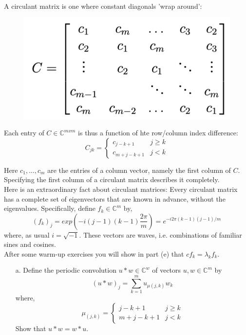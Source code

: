 \documentclass[12pt]{article}
\makeatletter
\theoremstyle{homework}
\newenvironment{exercise}[1]
{\def\@currentlabel{#1}\exercisecore}
{\endexercisecore}
\newcommand{\Cplx}{\ensuremath{\mathbb C}}
\let\CC\Cplx
\makeatother
\begin{document}
\begin{exercise}{P23} A circulant matrix is one where constant diagonals 'wrap around':

  \begin{figure}[H] 
    \begin{center}  
    \includegraphics[width = .45\textwidth]{CMatrix.png}  
    \end{center}  
  \end{figure}

  Each entry of $C \in \CC^{mxm}$ is thus a function of hte row/column index difference:
  \begin{equation*}
    C_{jk} =
    \begin{cases} 
      c_{j - k + 1} & j \geq k \\
      c_{m + j - k + 1}& j < k 
   \end{cases}
  \end{equation*}

  Here $c_1, \dots,c_m$ are the entries of a column vector, namely the first column of $C$. Specifying the first column 
  of a circulant matrix describes it completely.\\
  
  Here is an extraordinary fact about circulant matrices: Every circulant matrix has a complete set of eigenvectors that are known in advance, 
  without the eigenvalues. Specifically, define $f_k \in \CC^m$ by, 
  \begin{equation}
    (f_k)_j = exp(-i(j - 1)(k - 1)\dfrac{2\pi}{m})=e^{-i2\pi(k-1)(j-1)/m} \tag{2}
  \end{equation}
  where, as usual $i = \sqrt{-1}$. These vectors are waves, i.e. combinations of familiar sines and cosines.\\
  After some warm-up exercises you will show in part (e) that $cf_k = \lambda_kf_k$.\\
  \begin{enumerate}
    \item[a.] Define the periodic convolution $u * w \in \CC^w$ of vectors $u, w \in \CC^m$ by
    \begin{equation*}
      (u*w)_j = \sum_{k = 1}^m u_{\mu(j,k)}w_k
    \end{equation*}  
    where, 
    \begin{equation*}
      \mu_{(j,k)} = 
      \begin{cases}
        j - k + 1 & j \geq k\\
        m + j - k + 1 & j < k 
      \end{cases}
    \end{equation*}
    Show that $u*w = w*u$.\\


\end{enumerate}
\end{exercise}
\end{document}
